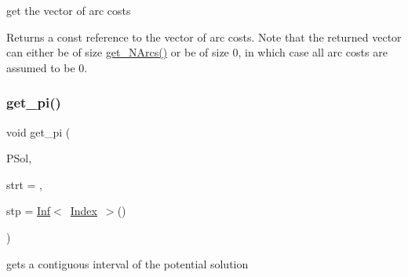 get the vector of arc costs 

Returns a const reference to the vector of arc costs. Note that the returned vector can either be of size \mbox{\hyperlink{class_s_m_spp__di__unipi__it_1_1_m_c_f_block_a42c106aa81abe650c7baa0da547ade7e}{get\+\_\+\+N\+Arcs()}} or be of size 0, in which case all arc costs are assumed to be 0. \mbox{\label{class_s_m_spp__di__unipi__it_1_1_m_c_f_block_a8c68bce513e68a3db6efb7c81260096a}} 
\subsubsection{\texorpdfstring{get\+\_\+pi()}{get\_pi()}\hspace{0.1cm}{\footnotesize\ttfamily [1/3]}}
{\footnotesize\ttfamily void get\+\_\+pi (\begin{DoxyParamCaption}\item[{\mbox{\hyperlink{class_s_m_spp__di__unipi__it_1_1_m_c_f_block_a9a7c9495f1f1feab22f3c556b70f60f0}{Vec\+\_\+\+C\+Number}} \&}]{P\+Sol,  }\item[{\mbox{\hyperlink{class_s_m_spp__di__unipi__it_1_1_m_c_f_block_aee6156e2ce80720d57a082d80f39d8cc}{c\+\_\+\+Index}}}]{strt = {},  }\item[{\mbox{\hyperlink{class_s_m_spp__di__unipi__it_1_1_m_c_f_block_aee6156e2ce80720d57a082d80f39d8cc}{c\+\_\+\+Index}}}]{stp = {\ttfamily \mbox{\hyperlink{class_s_m_spp__di__unipi__it_1_1_inf}{Inf}}$<$~\mbox{\hyperlink{class_s_m_spp__di__unipi__it_1_1_m_c_f_block_ad53d6229d7ec28555a9c9c2fd9abf773}{Index}}~$>$()} }\end{DoxyParamCaption})}



gets a contiguous interval of the potential solution 

